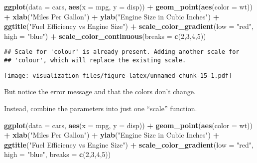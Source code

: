 \documentclass[oneside]{memoir}
\newenvironment{Shaded}{\begin{snugshade}}{\end{snugshade}}
\newcommand{\KeywordTok}[1]{\textcolor[rgb]{0.13,0.29,0.53}{\textbf{#1}}}
\newcommand{\DataTypeTok}[1]{\textcolor[rgb]{0.13,0.29,0.53}{#1}}
\newcommand{\DecValTok}[1]{\textcolor[rgb]{0.00,0.00,0.81}{#1}}
\newcommand{\StringTok}[1]{\textcolor[rgb]{0.31,0.60,0.02}{#1}}
\newcommand{\OperatorTok}[1]{\textcolor[rgb]{0.81,0.36,0.00}{\textbf{#1}}}
\newcommand{\NormalTok}[1]{#1}
\theoremstyle{definition}
\theoremstyle{definition}
\theoremstyle{definition}
\theoremstyle{remark}
\begin{document}
\begin{Shaded}
\begin{Highlighting}[]
\KeywordTok{ggplot}\NormalTok{(}\DataTypeTok{data =}\NormalTok{ cars, }\KeywordTok{aes}\NormalTok{(}\DataTypeTok{x =}\NormalTok{ mpg, }\DataTypeTok{y =}\NormalTok{ disp)) }\OperatorTok{+}
\StringTok{  }\KeywordTok{geom_point}\NormalTok{(}\KeywordTok{aes}\NormalTok{(}\DataTypeTok{color =}\NormalTok{ wt)) }\OperatorTok{+}
\StringTok{  }\KeywordTok{xlab}\NormalTok{(}\StringTok{"Miles Per Gallon"}\NormalTok{) }\OperatorTok{+}
\StringTok{  }\KeywordTok{ylab}\NormalTok{(}\StringTok{"Engine Size in Cubic Inches"}\NormalTok{) }\OperatorTok{+}
\StringTok{  }\KeywordTok{ggtitle}\NormalTok{(}\StringTok{"Fuel Efficiency vs Engine Size"}\NormalTok{) }\OperatorTok{+}
\StringTok{  }\KeywordTok{scale_color_gradient}\NormalTok{(}\DataTypeTok{low =} \StringTok{"red"}\NormalTok{, }\DataTypeTok{high =} \StringTok{"blue"}\NormalTok{) }\OperatorTok{+}
\StringTok{  }\KeywordTok{scale_color_continuous}\NormalTok{(}\DataTypeTok{breaks =} \KeywordTok{c}\NormalTok{(}\DecValTok{2}\NormalTok{,}\DecValTok{3}\NormalTok{,}\DecValTok{4}\NormalTok{,}\DecValTok{5}\NormalTok{))}
\end{Highlighting}
\end{Shaded}

\begin{verbatim}
## Scale for 'colour' is already present. Adding another scale for
## 'colour', which will replace the existing scale.
\end{verbatim}

\texttt{[image: visualization\_files/figure-latex/unnamed-chunk-15-1.pdf]}

But notice the error message and that the colors don't change.

Instead, combine the parameters into just one ``scale'' function.

\begin{Shaded}
\begin{Highlighting}[]
\KeywordTok{ggplot}\NormalTok{(}\DataTypeTok{data =}\NormalTok{ cars, }\KeywordTok{aes}\NormalTok{(}\DataTypeTok{x =}\NormalTok{ mpg, }\DataTypeTok{y =}\NormalTok{ disp)) }\OperatorTok{+}
\StringTok{  }\KeywordTok{geom_point}\NormalTok{(}\KeywordTok{aes}\NormalTok{(}\DataTypeTok{color =}\NormalTok{ wt)) }\OperatorTok{+}
\StringTok{  }\KeywordTok{xlab}\NormalTok{(}\StringTok{"Miles Per Gallon"}\NormalTok{) }\OperatorTok{+}
\StringTok{  }\KeywordTok{ylab}\NormalTok{(}\StringTok{"Engine Size in Cubic Inches"}\NormalTok{) }\OperatorTok{+}
\StringTok{  }\KeywordTok{ggtitle}\NormalTok{(}\StringTok{"Fuel Efficiency vs Engine Size"}\NormalTok{) }\OperatorTok{+}
\StringTok{  }\KeywordTok{scale_color_gradient}\NormalTok{(}\DataTypeTok{low =} \StringTok{"red"}\NormalTok{, }\DataTypeTok{high =} \StringTok{"blue"}\NormalTok{, }\DataTypeTok{breaks =} \KeywordTok{c}\NormalTok{(}\DecValTok{2}\NormalTok{,}\DecValTok{3}\NormalTok{,}\DecValTok{4}\NormalTok{,}\DecValTok{5}\NormalTok{)) }
\end{Highlighting}
\end{Shaded}
\end{document}
